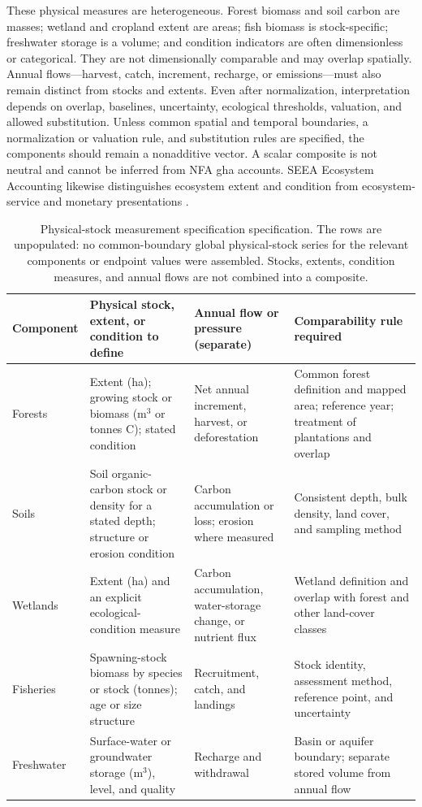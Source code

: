 \documentclass[11pt,a4paper]{article}
\begin{document}
These physical measures are heterogeneous. Forest biomass and soil carbon are masses; wetland and cropland extent are areas; fish biomass is stock-specific; freshwater storage is a volume; and condition indicators are often dimensionless or categorical. They are not dimensionally comparable and may overlap spatially. Annual flows—harvest, catch, increment, recharge, or emissions—must also remain distinct from stocks and extents. Even after normalization, interpretation depends on overlap, baselines, uncertainty, ecological thresholds, valuation, and allowed substitution. Unless common spatial and temporal boundaries, a normalization or valuation rule, and substitution rules are specified, the components should remain a nonadditive vector. A scalar composite is not neutral and cannot be inferred from NFA gha accounts. SEEA Ecosystem Accounting likewise distinguishes ecosystem extent and condition from ecosystem-service and monetary presentations \citep{UN2021SEEA_EA}.

\begin{table}[htbp]
\centering\footnotesize
\caption{Physical-stock measurement specification specification. The rows are unpopulated: no common-boundary global physical-stock series for the relevant components or endpoint values were assembled. Stocks, extents, condition measures, and annual flows are not combined into a composite.}
\label{tab:si_stock_measurement specification}
\begin{tabularx}{\textwidth}{@{}>{\raggedright\arraybackslash}p{} >{\raggedright\arraybackslash}p{} >{\raggedright\arraybackslash}p{} >{\raggedright\arraybackslash}X@{}}
\toprule
Component & Physical stock, extent, or condition to define & Annual flow or pressure (separate) & Comparability rule required \\
\midrule
Forests & Extent (ha); growing stock or biomass (m$^3$ or tonnes C); stated condition & Net annual increment, harvest, or deforestation & Common forest definition and mapped area; reference year; treatment of plantations and overlap \\
Soils & Soil organic-carbon stock or density for a stated depth; structure or erosion condition & Carbon accumulation or loss; erosion where measured & Consistent depth, bulk density, land cover, and sampling method \\
Wetlands & Extent (ha) and an explicit ecological-condition measure & Carbon accumulation, water-storage change, or nutrient flux & Wetland definition and overlap with forest and other land-cover classes \\
Fisheries & Spawning-stock biomass by species or stock (tonnes); age or size structure & Recruitment, catch, and landings & Stock identity, assessment method, reference point, and uncertainty \\
Freshwater & Surface-water or groundwater storage (m$^3$), level, and quality & Recharge and withdrawal & Basin or aquifer boundary; separate stored volume from annual flow \\
\bottomrule
\end{tabularx}
\end{table}
\end{document}
